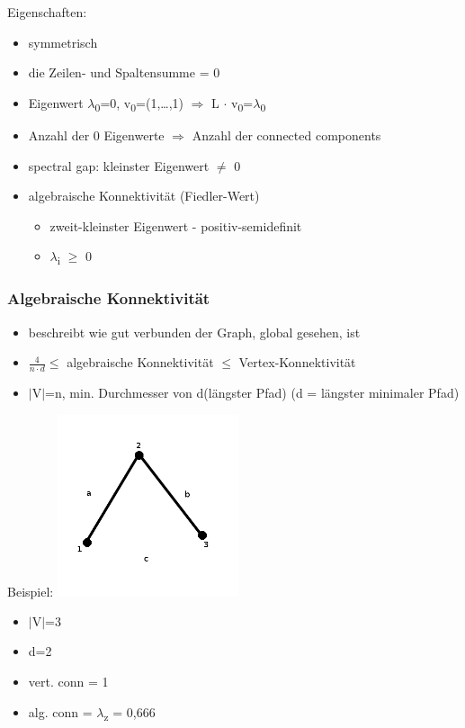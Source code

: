 Eigenschaften:\\
\begin{itemize}
	\item symmetrisch
	\item die Zeilen- und Spaltensumme = 0
	\item Eigenwert $\lambda$\textsubscript{0}=0, v\textsubscript{0}=(1,\ldots,1) $\Rightarrow$ L $\cdot$ v\textsubscript{0}=$\lambda$\textsubscript{0}
	\item Anzahl der 0 Eigenwerte $\Rightarrow$ Anzahl der connected components
	\item spectral gap: kleinster Eigenwert $\neq$ 0
	\item algebraische Konnektivität (Fiedler-Wert)
	\begin{itemize}
		\item zweit-kleinster Eigenwert - positiv-semidefinit
		\item $\lambda$\textsubscript{i} $\geq$ 0
	\end{itemize}
\end{itemize}

\subsubsection{Algebraische Konnektivität}
\begin{itemize}
	\item beschreibt wie gut verbunden der Graph, global gesehen, ist
	\item $\frac{4}{n \cdot d} \leq$ algebraische Konnektivität $\leq$ Vertex-Konnektivität
	\item $|$V$|$=n, min. Durchmesser von d(längster Pfad) (d = längster minimaler Pfad)
\end{itemize}

Beispiel:
\includegraphics[width=0.4\textwidth]{lectures/161028/pix/dreieck.png}\newline
\begin{itemize}
	\item $\mid$V$\mid$=3
	\item d=2
	\item vert. conn = 1
	\item alg. conn = $\lambda$\textsubscript{z} = 0,666 
\end{itemize}

